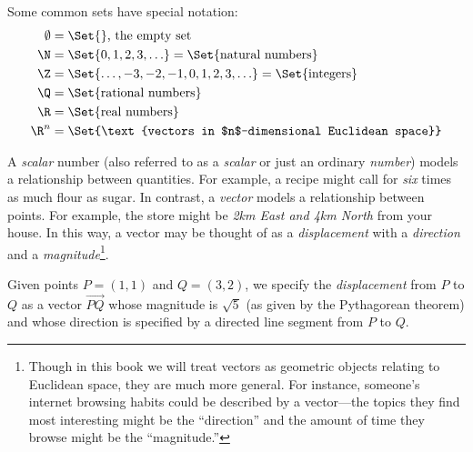
Some common sets have special notation:
\begin{align*}
	\emptyset &= \Set{}\text{, the empty set}\\
	\N &= \Set{0,1,2,3,\ldots}=\Set{\text{natural numbers}}\\
	\Z &= \Set{\ldots, -3,-2,-1,0,1,2,3,\ldots}=\Set{\text{integers}}\\
	\Q &= \Set{\text{rational numbers}}\\
	\R &= \Set{\text{real numbers}}\\
	\R^n &= \Set{\text{vectors in $n$-dimensional Euclidean space}}\\
\end{align*}



A \emph{scalar} number (also referred to as a \emph{scalar} or just an ordinary
\emph{number}) models a relationship between quantities. For example,
a recipe might call for \emph{six} times as much flour as sugar. In 
contrast, a \emph{vector} models a relationship between points. For example,
the store might be \emph{2km East and 4km North} from your house.
In this way, a vector may be thought of as a \emph{displacement} with a \emph{direction}
and a \emph{magnitude}\footnote{
	Though in this book we will treat vectors as geometric objects 
	relating to Euclidean
	space, they are much more general.  For instance, someone's internet
	browsing habits could be described by a vector---the topics they
	find most interesting might be the ``direction'' and the amount
	of time they browse might be the ``magnitude.''
}.

Given points $P=(1,1)$ and $Q=(3,2)$, we specify the
\emph{displacement} from $P$ to $Q$ as a vector
$\overrightarrow{PQ}$ whose magnitude is $\sqrt{5}$ (as given by the Pythagorean
theorem) and whose direction is specified by a directed line segment from $P$ to $Q$.

